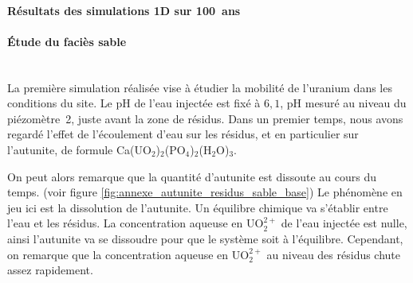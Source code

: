 \documentclass{article}
\begin{document}
\paragraph{Résultats des simulations 1D sur 100~ans}


\paragraph{Étude du faciès sable \\ \\}
La première simulation réalisée vise à étudier la mobilité de l’uranium dans les conditions du site. Le pH de l’eau injectée est fixé à $6,1$, pH mesuré au niveau du piézomètre~2, juste avant la zone de résidus. Dans un premier temps, nous avons regardé l’effet de l’écoulement d’eau sur les résidus, et en particulier sur l’autunite, de formule Ca(UO$_2$)$_2$(PO$_4$)$_2$(H$_2$O)$_3$.

On peut alors remarque que la quantité d’autunite est dissoute au cours du temps. (voir figure \ref{fig:annexe_autunite_residus_sable_base}) Le phénomène en jeu ici est la dissolution de l’autunite. Un équilibre chimique va s’établir entre l’eau et les résidus. La concentration aqueuse en UO$_2^{2+}$ de l’eau injectée est nulle, ainsi l’autunite va se dissoudre pour que le système soit à l’équilibre. Cependant, on remarque que la concentration aqueuse en UO$_2^{2+}$ au niveau des résidus chute assez rapidement.
\end{document}
